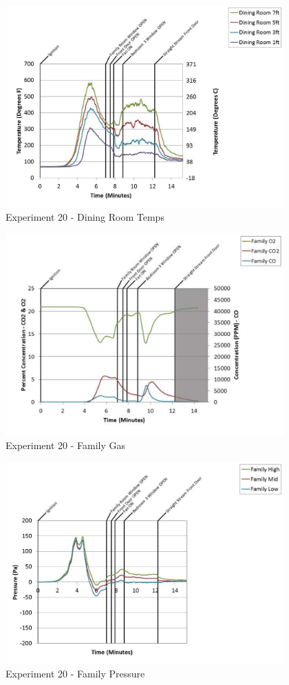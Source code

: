 \documentclass{article}
\begin{document}
\begin{appendices}
	\begin{figure}[h!]
		\centering
		\includegraphics[height=3.05in]{0_Images/Results_Charts/Exp_20_Charts/DiningRoomTemps.pdf}
		\caption{Experiment 20 - Dining Room Temps}
	\end{figure}
 
	\clearpage

	\begin{figure}[h!]
		\centering
		\includegraphics[height=3.05in]{0_Images/Results_Charts/Exp_20_Charts/FamilyGas.pdf}
		\caption{Experiment 20 - Family Gas}
	\end{figure}
 

	\begin{figure}[h!]
		\centering
		\includegraphics[height=3.05in]{0_Images/Results_Charts/Exp_20_Charts/FamilyPressure.pdf}
		\caption{Experiment 20 - Family Pressure}
	\end{figure}
 

\end{appendices}
\end{document}

